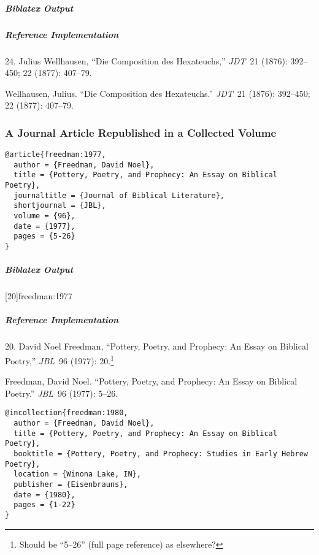 \documentclass[a4paper]{article}
\newenvironment{biboutput}{%
  \subparagraph{Biblatex Output}
}{\color{black}}
\newenvironment{refimp}{%
  \subparagraph{Reference Implementation}
  \color{reference-colour}
  \rm
}{\par\color{black}}
\begin{document}
\begin{biboutput}
\end{biboutput}

\begin{refimp}
  \hspace*{\bibindent}24. Julius Wellhausen, “Die Composition des Hexateuchs,”
  \emph{JDT}~21 (1876): 392–450; 22 (1877): 407–79.

  \hangindent\bibindent Wellhausen, Julius. “Die Composition des Hexateuchs.”
  \emph{JDT}~21 (1876): 392–450; 22 (1877): 407–79.

\end{refimp}

\subsubsection{A Journal Article Republished in a Collected Volume}

\begin{lstlisting}
@article{freedman:1977,
  author = {Freedman, David Noel},
  title = {Pottery, Poetry, and Prophecy: An Essay on Biblical Poetry},
  journaltitle = {Journal of Biblical Literature},
  shortjournal = {JBL},
  volume = {96},
  date = {1977},
  pages = {5-26}
}
\end{lstlisting}

\begin{biboutput}
  [20]{freedman:1977}
\end{biboutput}

\begin{refimp}
  \hspace*{\bibindent}20. David Noel Freedman, “Pottery, Poetry, and Prophecy:
  An Essay on Biblical Poetry,” \emph{JBL}~96 (1977): 20.\footnote{Should be
  “5–26” (full page reference) as elsewhere?}

  \hangindent\bibindent Freedman, David Noel. “Pottery, Poetry, and Prophecy:
  An Essay on Biblical Poetry.” \emph{JBL}~96 (1977): 5–26.

\end{refimp}

\begin{lstlisting}
@incollection{freedman:1980,
  author = {Freedman, David Noel},
  title = {Pottery, Poetry, and Prophecy: An Essay on Biblical Poetry},
  booktitle = {Pottery, Poetry, and Prophecy: Studies in Early Hebrew Poetry},
  location = {Winona Lake, IN},
  publisher = {Eisenbrauns},
  date = {1980},
  pages = {1-22}
}
\end{lstlisting}
\end{document}
